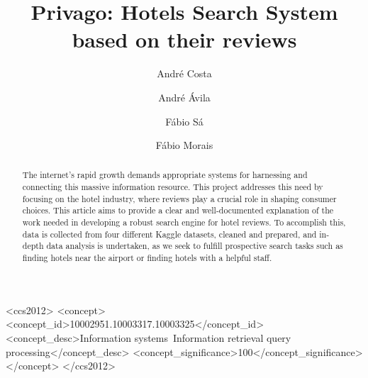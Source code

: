 \documentclass[sigconf]{acmart}
\begin{document}
\title{Privago: Hotels Search System based on their reviews}

\author{André Costa}

\author{André Ávila}

\author{Fábio Sá}

\author{Fábio Morais}


\begin{abstract}
  The internet's rapid growth demands appropriate systems for harnessing and connecting this massive information resource. This project addresses this need by focusing on the hotel industry, where reviews play a crucial role in shaping consumer choices. This article aims to provide a clear and well-documented explanation of the work needed in developing a robust search engine for hotel reviews. To accomplish this, data is collected from four different Kaggle datasets, cleaned and prepared, and in-depth data analysis is undertaken, as we seek to fulfill prospective search tasks such as finding hotels near the airport or finding hotels with a helpful staff.
\end{abstract}

\begin{CCSXML}
<ccs2012>
<concept>
<concept_id>10002951.10003317.10003325</concept_id>
<concept_desc>Information systems~Information retrieval query processing</concept_desc>
<concept_significance>100</concept_significance>
</concept>
</ccs2012>
\end{CCSXML}
\end{document}
